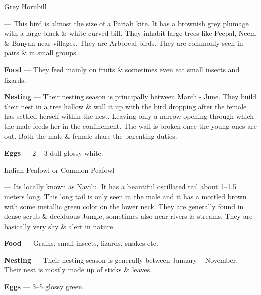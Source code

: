 \begin{bird}{Grey Hornbill}

 --- This bird is almost the size of a Pariah kite. It has a brownish grey plumage with a large black \& white curved bill. They inhabit large trees like Peepal, Neem \& Banyan near villages. They are Arboreal birds. They are commonly seen in pairs \& in small groups.

{\large\bf Food} --- They feed mainly on fruits \& sometimes even eat small insects and lizards.

{\large\bf Nesting} --- Their nesting season is principally between March - June. They build their nest in a tree hallow \& wall it up with the bird dropping after the female has settled herself within the nest. Leaving only a narrow opening through which the male feeds her in the confinement. The wall is broken once the young ones are out. Both the male \& female share the parenting duties.

{\large\bf Eggs} --- 2 -- 3 dull glossy white.
\end{bird}


\begin{bird}{Indian Peafowl or Common Peafowl}

 --- Its locally known as Navilu. It has a beautiful oscillated tail about 1--1.5 meters long. This long tail is only seen in the male and it has a mottled brown with some metallic green color on the lower neck. They are generally found in dense scrub \& deciduous Jungle, sometimes also near rivers \& streams. They are basically very shy \& alert in nature.

{\large\bf Food} --- Grains, small insects, lizards, snakes etc.

{\large\bf Nesting} --- Their nesting season is generally between January -- November. Their nest is mostly made up of sticks \& leaves.

{\large\bf Eggs} --- 3--5 glossy green.
\end{bird}

